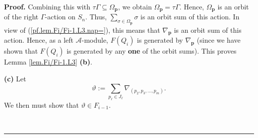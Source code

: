 \documentclass[numbers=enddot,12pt,final,onecolumn,notitlepage]{scrartcl}%
\theoremstyle{definition}
\newenvironment{proof}[1][Proof]{\noindent\textbf{#1.} }{\ \rule{0.5em}{0.5em}}
\let\sumnonlimits\sum
\renewcommand{\sum}{\sumnonlimits\limits}
\begin{document}
\begin{proof}
Combining this with $\tau\Gamma\subseteq\Omega_{\mathbf{p}}$, we obtain
$\Omega_{\mathbf{p}}=\tau\Gamma$. Hence, $\Omega_{\mathbf{p}}$ is an orbit of
the right $\Gamma$-action on $S_{n}$. Thus, $\sum_{\sigma\in\Omega
_{\mathbf{p}}}\sigma$ is an orbit sum of this action. In view of
(\ref{pf.lem.Fi/Fi-1.L3.nap=}), this means that $\nabla_{\mathbf{p}}$ is an
orbit sum of this action. Hence, as a left $\mathcal{A}$-module, $F\left(
Q_{i}\right)  $ is generated by $\nabla_{\mathbf{p}}$ (since we have shown
that $F\left(  Q_{i}\right)  $ is generated by any \textbf{one} of the orbit
sums). This proves Lemma \ref{lem.Fi/Fi-1.L3} \textbf{(b)}. \medskip

\textbf{(c)} Let
\begin{equation}
\vartheta:=\sum_{p_{\ell}\in J_{\ell}}\nabla_{\left(  p_{2},p_{3},\ldots
,p_{m}\right)  }.\label{pf.lem.Fi/Fi-1.L3.c.1}%
\end{equation}
We then must show that $\vartheta\in F_{i-1}$.


\end{proof}
\end{document}
